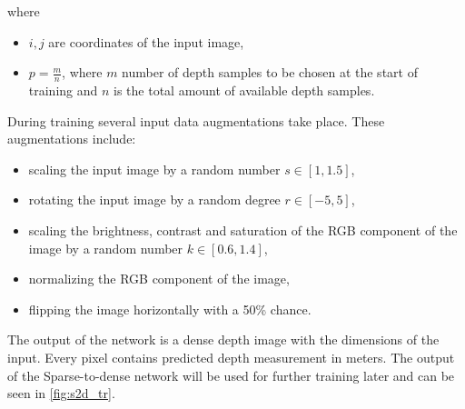 \documentclass[twoside]{ctuthesis}
\theoremstyle{plain}
\theoremstyle{definition}
\theoremstyle{note}
\begin{document}
where
\begin{itemize}
	\item $i,j$ are coordinates of the input image,
	\item $p=\frac{m}{n}$, where $m$ number of depth samples to be chosen at the start of training and $n$ is the total amount of available depth samples.
\end{itemize}
During training several input data augmentations take place. These augmentations include:
\begin{itemize}
	\item scaling the input image by a random number $s\in[1,1.5]$,
	\item rotating the input image by a random degree $r\in[-5,5]$,
	\item scaling the brightness, contrast and saturation of the RGB component of the image by a random number $k\in[0.6,1.4]$,
	\item normalizing the RGB component of the image,
	\item flipping the image horizontally with a 50\% chance.
\end{itemize}
The output of the network is a dense depth image with the dimensions of the input. Every pixel contains predicted depth measurement in meters. The output of the Sparse-to-dense network will be used for further training later and can be seen in \autoref{fig:s2d_tr}.
\end{document}
